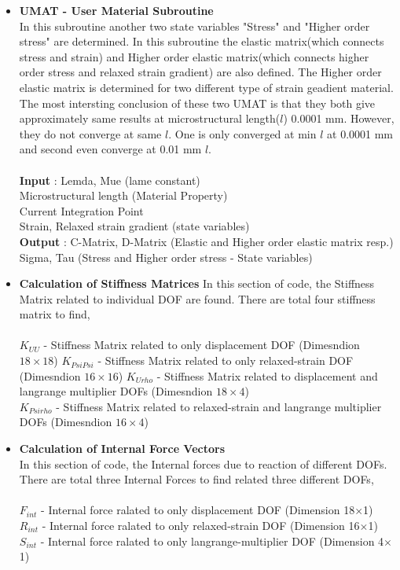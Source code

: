\documentclass[12pt]{article}
\begin{document}
\begin{itemize}
	\item \textbf{UMAT - User Material Subroutine} \\
	In this subroutine another two state variables "Stress" and "Higher order stress" are determined. In this subroutine the elastic matrix(which connects stress and strain) and Higher order elastic matrix(which connects higher order stress and relaxed strain gradient) are also defined. The Higher order elastic matrix is determined for two different type of strain geadient material. The most intersting conclusion of these two UMAT is that they both give approximately same results at microstructural length($l$) 0.0001 mm. However, they do not converge at same $l$. One is only converged at min $l$ at 0.0001 mm and second even converge at 0.01 mm $l$. \\ \\
	\textbf{Input} : Lemda, Mue (lame constant)  \\
	Microstructural length (Material Property) \\
	Current Integration Point \\
	Strain, Relaxed strain gradient (state variables) \\
	\textbf{Output} : C-Matrix, D-Matrix (Elastic and Higher order elastic matrix resp.) \\
	Sigma, Tau (Stress and Higher order stress - State variables)
	
	\item \textbf{Calculation of Stiffness Matrices}
	In this section of code, the Stiffness Matrix related to individual DOF are found. There are total four stiffness matrix to find, \\ \\
	$K_{UU}$ - Stiffness Matrix related to only displacement DOF (Dimesndion $18\times18$)
	$K_{PsiPsi}$ - Stiffness Matrix related to only relaxed-strain DOF (Dimesndion $16\times16$)
	$K_{Urho}$ - Stiffness Matrix related to displacement and langrange multiplier DOFs (Dimesndion $18\times4$) \\
	$K_{Psirho}$ - Stiffness Matrix related to relaxed-strain and langrange multiplier DOFs (Dimesndion $16\times4$)
	
	\item \textbf{Calculation of Internal Force Vectors} \\
	In this section of code, the Internal forces due to reaction of different DOFs. There are total three Internal Forces to find related three different DOFs, \\ \\
	$F_{int}$ - Internal force ralated to only displacement DOF (Dimension 18$\times$1) \\
	$R_{int}$ - Internal force ralated to only relaxed-strain DOF (Dimension 16$\times$1) \\
	$S_{int}$ - Internal force ralated to only langrange-multiplier DOF (Dimension 4$\times$1)
	

\end{itemize}
\end{document}
